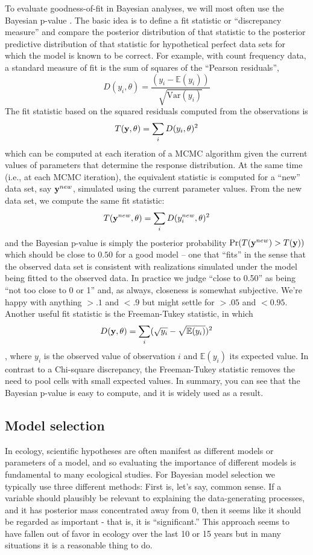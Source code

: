 To evaluate goodness-of-fit in Bayesian analyses, we will most often
use the Bayesian p-value \citep{gelman_etal:1996}.  The basic idea is to define
a fit statistic or ``discrepancy measure'' and compare the posterior distribution of that
statistic to the posterior predictive distribution of that statistic
for hypothetical perfect data sets for which the model is known to be correct. For
example, with count frequency data, a standard measure of fit is the
sum of squares of the ``Pearson residuals'',
\[
D(y_i,\theta) = \frac{(y_i - \mathbb{E}(y_i))}{\sqrt{\mbox{Var}( y_{i} )}}
\]
The fit statistic based on the squared residuals computed from the
observations is 
\[
T({\bf y}, \theta) = \sum_{i} D(y_{i},\theta)^{2}
\]
which can be computed at each iteration of a MCMC algorithm given the
current values of parameters that determine the
 response distribution.  At the same time (i.e., at each MCMC
 iteration),
the equivalent statistic is computed for a
``new'' data set, say ${\bf y}^{new}$, 
simulated using the current parameter values. From the new data set,
we compute the same fit statistic:
\[
T({\bf y}^{new}, \theta) = \sum_{i} D(y_{i}^{new},\theta)^{2}
\]
and 
the
Bayesian p-value is simply the posterior probability $\Pr(T({\bf
  y}^{new})  >  T({\bf y}))$
 which should be close to $0.50$ for a good model -- one that
 ``fits'' in the sense that the observed data set is
 consistent with realizations simulated under the model being fitted
 to the observed data. In practice
we judge ``close to 0.50'' as being ``not too close to 0 or 1'' and,
as always, closeness is somewhat subjective. We're happy with anything
$>.1$ and $<.9$ but might settle for $>.05$ and $<0.95$. 
Another useful fit statistic is the Freeman-Tukey
statistic, in which
\[
D({\bf y},\theta) = \sum_{i} ( \sqrt{y_{i}} - \sqrt{\mathbb{E}(y_{i})} )^2
\]
\citep{brooks_etal:2000}, where $y_{i}$ is the observed value of
observation $i$ and $\mathbb{E}(y_{i})$ its expected value. In contrast to a
Chi-square discrepancy, the Freeman-Tukey statistic removes the need
to pool cells with small expected values.
In summary, you can see that 
the Bayesian p-value is easy to compute,
and it is widely used as a result.


\subsection{Model selection }

In ecology, scientific hypotheses are often manifest as different models or parameters
 of a model, and so
evaluating the importance of different models is fundamental 
to many ecological studies.
For Bayesian model selection we typically use three different methods: First
is, let's say, common sense. If a variable should plausibly be
relevant to explaining the data-generating processes, and it has 
 posterior mass
concentrated away from 0, then it seems like it should be regarded as
important - that is, it is ``significant.''  This approach seems to
have fallen out of favor in ecology over the last 10 or
15 years but in many situations it is a reasonable thing to do.

